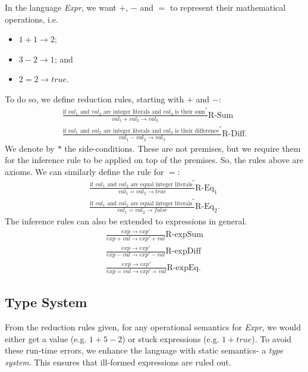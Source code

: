 \documentclass[a4paper, openany]{memoir}
\begin{document}
    In the language \textit{Expr}, we want $+$, $-$ and $=$ to represent their mathematical operations, i.e. 
    \begin{itemize}
        \item $1 + 1 \to 2$;
        \item $3 - 2 \to 1$; and
        \item $2 = 2 \to \textit{true}$. 
    \end{itemize}
    To do so, we define reduction rules, starting with $+$ and $-$:
    \begin{align*}
        \frac{\textrm{if } val_1 \textrm{ and } val_2 \textrm{ are integer literals and } val_3 \textrm{ is their sum}^*}{val_1 + val_2 \to val_3} \textrm{R-Sum} \\
        \frac{\textrm{if } val_1 \textrm{ and } val_2 \textrm{ are integer literals and } val_3 \textrm{ is their difference}^*}{val_1 - val_2 \to val_3} \textrm{R-Diff}.
    \end{align*}
    We denote by $*$ the side-conditions. These are not premises, but we require them for the inference rule to be applied on top of the premises. So, the rules above are axioms. We can similarly define the rule for $=$:
    \begin{align*}
        \frac{\textrm{if } val_1 \textrm{ and } val_2 \textrm{ are equal integer literals}^*}{val_1 = val_2 \to \textit{true}} \textrm{R-Eq}_1 \\
        \frac{\textrm{if } val_1 \textrm{ and } val_2 \textrm{ are equal integer literals}^*}{val_1 = val_2 \to \textit{false}} \textrm{R-Eq}_2.
    \end{align*}
    The inference rules can also be extended to expressions in general.
    \begin{align*}
        \frac{exp \to exp'}{exp + val \to exp' + val} \textrm{R-expSum} \\
        \frac{exp \to exp'}{exp - val \to exp' - val} \textrm{R-expDiff} \\
        \frac{exp \to exp'}{exp = val \to exp' = val} \textrm{R-expEq}.
    \end{align*}

    \subsection{Type System}
    From the reduction rules given, for any operational semantics for \textit{Expr}, we would either get a value (e.g. $1 + 5 - 2$) or stuck expressions (e.g. $1 + \textit{true}$). To avoid these run-time errors, we enhance the language with static semantics- a \emph{type system}. This ensures that ill-formed expressions are ruled out.
\end{document}
